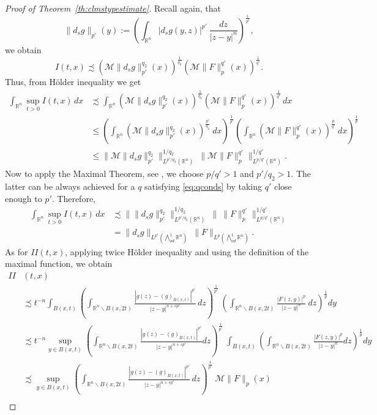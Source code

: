 \documentclass[12pt]{amsart}
\theoremstyle{definition}
\newcommand{\R}{\mathbb{R}}
\newcommand{\brac}[1]{\left (#1 \right )}
\newcommand{\Ep}{\bigwedge\nolimits}
\numberwithin{theorem}{section} \numberwithin{equation}{section}
\newcommand{\aleq}{\precsim}
\begin{document}
\begin{proof}[Proof of Theorem~\ref{th:clmstypestimate}]
Recall again, that
\[
 \|d_s g\|_{p'}(y) := \brac{\int_{\R^n} |d_s g(y,z)|^{p'}\ \frac{dz}{|z-y|^{n}} }^{\frac{1}{p'}},
\]
we obtain
\[
 I(t,x) \aleq\brac{\mathcal{M} \|d_s g\|_{p'}^{q_2}(x)}^{\frac{1}{q_2}} \brac{\mathcal{M} \|F\|_{p}^{q'}(x)}^{\frac{1}{q'}}.
\]
Thus, from H\"{o}lder inequality we get
% 
\begin{equation}\label{eq:I}
 \begin{split}
  \int_{\R^n}\sup_{t>0} I(t,x) \,dx &\aleq \int_{\R^n} \brac{\mathcal{M} \|d_s g\|_{p'}^{q_2}(x)}^{\frac{1}{q_2}} \brac{\mathcal{M} \|F\|_{p}^{q'}(x)}^{\frac{1}{q'}}\,dx\\
  &\le \brac{\int_{\R^n} \brac{\mathcal{M} \|d_s g\|_{p'}^{q_2}(x)}^{\frac{p'}{q_2}}\ dx}^\frac{1}{p'} \brac{\int_{\R^n} \brac{\mathcal{M} \|F\|_{p}^{q'}(x)}^{\frac{p}{q'}}\ dx}^\frac{1}{p}\\
  &\le \big \|\mathcal{M}\|d_s g\|_{p'}^{q_2}\big \|_{L^{p'/q_2}(\R^n)}^{1/q_2}\ \big \|\mathcal{M}\|F\|_{p}^{q'}\big \|_{L^{p/q'}(\R^n)}^{1/q'}.
 \end{split}
\end{equation}
Now to apply the Maximal Theorem, see \cite[Theorem 1(c), p.13]{Stein-harmonic}, we choose $p/q'>1$ and $p'/q_2>1$. The latter can be always achieved for a $q$ satisfying \eqref{eq:qconds} by taking $q'$ close enough to $p'$. Therefore,
\[
\begin{split}
 \int_{\R^n}\sup_{t>0} I(t,x) \,dx &\aleq \big \|\|d_s g\|_{p'}^{q_2}\big \|_{L^{p'/q_2}(\R^n)}^{1/q_2}\ \big\|\ \|F\|_{p}^{q'} \big\|_{L^{p/q'}(\R^n)}^{1/q'}\\
 &= \|d_s g\|_{L^{p'}(\Ep^1_{od} \R^n)}\ \|F\|_{L^p(\Ep^1_{od} \R^n)}.
 \end{split}
\]
% 
As for $II(t,x)$, applying twice H\"older inequality and using the definition of the maximal function, we obtain
\[
\begin{split}
 II&(t,x) \\&\aleq  t^{-n} \int_{B(x,t)} \brac{\int_{\R^n \backslash B(x,2t)} \frac{|g(z)-(g)_{B(x,t)}|^{p'}}{|z-y|^{n+sp'}}\, dz}^{\frac{1}{p'}}\  \brac{\int_{\R^n \backslash B(x,2t)} \frac{|F(z,y)|^p}{|z-y|^{n}}\ dz}^{\frac{1}{p}} dy\\
 &\aleq  t^{-n} \sup_{y \in B(x,t)}\brac{\int_{\R^n \backslash B(x,2t)} \frac{|g(z)-(g)_{B(x,t)}|^{p'}}{|z-y|^{n+sp'}} dz}^{\frac{1}{p'}}\  \int_{B(x,t)} \brac{\int_{\R^n \backslash B(x,2t)} \frac{|F(z,y)|^p}{|z-y|^{n}} dz}^{\frac{1}{p}} dy\\
 &\aleq  \sup_{y \in B(x,t)}\brac{\int_{\R^n \backslash B(x,2t)} \frac{|g(z)-(g)_{B(x,t)}|^{p'}}{|z-y|^{n+sp'}}\, dz}^{\frac{1}{p'}}\  \mathcal{M}\|F\|_p(x)\\

\end{split}\]
\end{proof}
\end{document}
